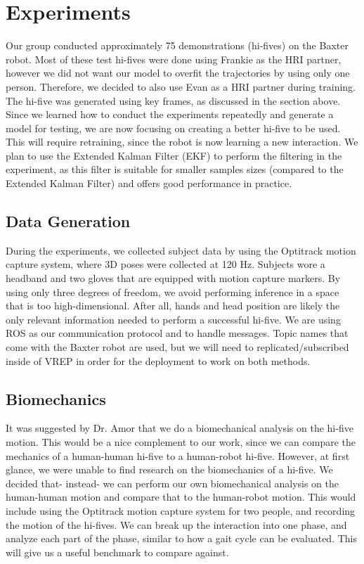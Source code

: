 \documentclass[letterpaper, 10 pt, conference]{ieeeconf}  %
\begin{document}
\section{Experiments}
\indent Our group conducted approximately 75 demonstrations (hi-fives) on the Baxter robot. Most of these test hi-fives were done using Frankie as the HRI partner, however we did not want our model to overfit the trajectories by using only one person. Therefore, we decided to also use Evan as a HRI partner during training. The hi-five was generated using key frames, as discussed in the section above. Since we learned how to conduct the experiments repeatedly and generate a model for testing, we are now focusing on creating a better hi-five to be used. This will require retraining, since the robot is now learning a new interaction. We plan to use the Extended Kalman Filter (EKF) to perform the filtering in the experiment, as this filter is suitable for smaller samples sizes (compared to the Extended Kalman Filter) and offers good performance in practice.

\subsection{Data Generation}
During the experiments, we collected subject data by using the Optitrack motion capture system, where 3D poses were collected at 120 Hz. Subjects wore a headband and two gloves that are equipped with motion capture markers. By using only three degrees of freedom, we avoid performing inference in a space that is too high-dimensional. After all, hands and head position are likely the only relevant information needed to perform a successful hi-five. We are using ROS as our communication protocol and to handle messages. Topic names that come with the Baxter robot are used, but we will need to replicated/subscribed inside of VREP in order for the deployment to work on both methods.

\subsection{Biomechanics}
It was suggested by Dr. Amor that we do a biomechanical analysis on the hi-five motion. This would be a nice complement to our work, since we can compare the mechanics of a human-human hi-five to a human-robot hi-five. However, at first glance, we were unable to find research on the biomechanics of a hi-five. We decided that- instead- we can perform our own biomechanical analysis on the human-human motion and compare that to the human-robot motion. This would include using the Optitrack motion capture system for two people, and recording the motion of the hi-fives. We can break up the interaction into one phase, and analyze each part of the phase, similar to how a gait cycle can be evaluated. This will give us a useful benchmark to compare against.
\end{document}
